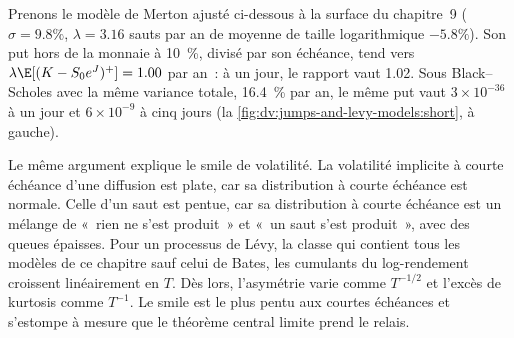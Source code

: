 \begin{example}\label{ex:dv:jumps-and-levy-models:carrwu}
Prenons le modèle de Merton ajusté ci-dessous à la surface du chapitre~9 ($\sigma=9.8\%$, $\lambda=3.16$ sauts par an de moyenne
de taille logarithmique $-5.8\%$). Son put hors de la monnaie à 10~\%, divisé par son échéance, tend vers
$\lambda\E[(K-S_0e^J)^+]=1.00$ par an~: à un jour, le rapport vaut 1.02. Sous Black--Scholes avec la même
variance totale, 16.4~\% par an, le même put vaut $3\times10^{-36}$ à un jour et $6\times10^{-9}$ à cinq jours
(la \cref{fig:dv:jumps-and-levy-models:short}, à gauche).
\end{example}

Le même argument explique le smile de volatilité. La volatilité implicite à courte échéance d'une diffusion est plate, car
sa distribution à courte échéance est normale. Celle d'un saut est pentue, car sa distribution à courte échéance est un mélange
de «~rien ne s'est produit~» et «~un saut s'est produit~», avec des queues épaisses. Pour un processus de Lévy, la classe qui contient
tous les modèles de ce chapitre sauf celui de Bates, les cumulants du log-rendement croissent linéairement en $T$. Dès lors,
l'asymétrie varie comme $T^{-1/2}$ et l'excès de kurtosis comme $T^{-1}$. Le smile est le plus pentu aux courtes
échéances et s'estompe à mesure que le théorème central limite prend le relais.

